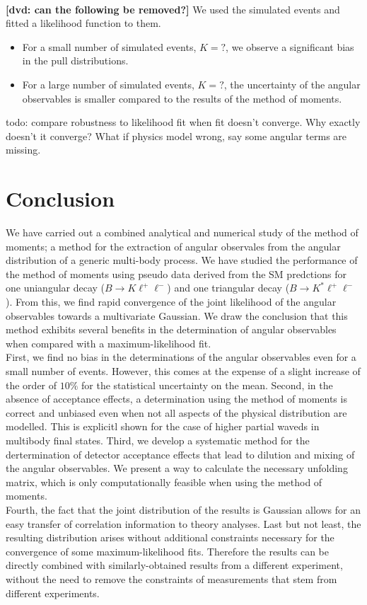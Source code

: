 \documentclass[aps,prd,reprint,nofootinbib,preprintnumbers]{revtex4}
\newcommand{\danny}[1]{{\color{purple}#1}}
\begin{document}
\hrulefill\\
{\textbf{\color{red}[dvd: can the following be removed?]}
We used the simulated events and fitted a likelihood function to them.
\begin{itemize}
    \item For a small number of simulated events, \danny{$K=?$}, we observe a significant bias in the pull distributions.
    \item For a large number of simulated events, \danny{$K=?$}, the uncertainty of the angular observables is
        smaller compared to the results of the method of moments.
\end{itemize}
todo: compare robustness to likelihood fit when fit doesn't
converge. Why exactly doesn't it converge? What if physics model
wrong, say some angular terms are missing.}
\hrulefill


\section{Conclusion}

We have carried out a combined analytical and numerical study of the method of moments; a method for
the extraction of angular observales from the angular distribution of a generic multi-body process.
We have studied the performance of the method of moments using pseudo data derived from the SM
predctions for one uniangular decay ($B\to K\ell^+\ell^-$) and one triangular decay ($B\to K^*\ell^+\ell^-$).
From this, we find rapid convergence of the joint likelihood of the angular observables towards a multivariate Gaussian.
We draw the conclusion that this method exhibits several benefits in the determination of angular observables when
compared with a maximum-likelihood fit.\\

First, we find no bias in the determinations of the angular observables even for a small number of events.
However, this comes at the expense of a slight increase of the order of $10\%$ for the statistical uncertainty
on the mean.
Second, in the absence of acceptance effects, a determination using the method of moments is correct and unbiased
even when not all aspects of the physical distribution are modelled. This is explicitl shown for the case of
higher partial waveds in multibody final states.
Third, we develop a systematic method for the dertermination of detector acceptance effects that lead to
dilution and mixing of the angular observables. We present a way to calculate the necessary unfolding matrix,
which is only computationally feasible when using the method of moments.\\
Fourth, the fact that the joint distribution of the results is Gaussian allows for an easy transfer of correlation
information to theory analyses.
Last but not least, the resulting distribution arises without additional constraints necessary for the convergence
of some maximum-likelihood fits. Therefore the results can be directly combined with similarly-obtained results from
a different experiment, without the need to remove the constraints of measurements that stem from different experiments.\\
\end{document}
